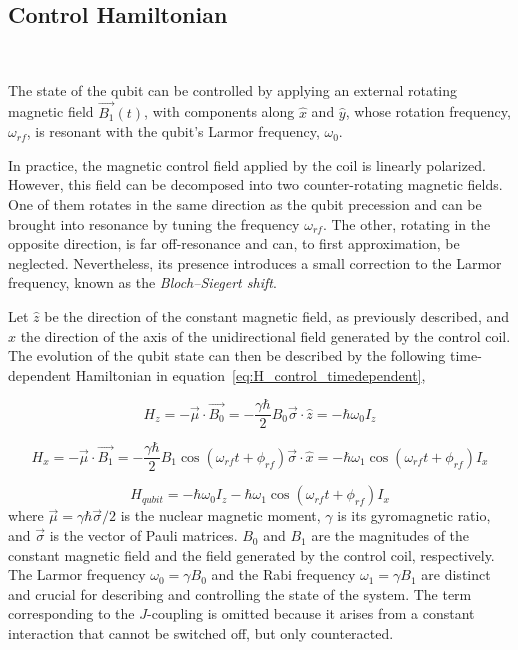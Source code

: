 \subsection{Control Hamiltonian}
~\label{subsec:control_hamiltonian}

The state of the qubit can be controlled by applying an external rotating magnetic field \(\vec{B_1}(t)\), with components along \(\hat{x}\) and \(\hat{y}\), whose rotation frequency, \(\omega_{rf}\), is resonant with the qubit’s Larmor frequency, \(\omega_0\).

In practice, the magnetic control field applied by the coil is linearly polarized. However, this field can be decomposed into two counter-rotating magnetic fields. One of them rotates in the same direction as the qubit precession and can be brought into resonance by tuning the frequency \(\omega_{rf}\). The other, rotating in the opposite direction, is far off-resonance and can, to first approximation, be neglected. Nevertheless, its presence introduces a small correction to the Larmor frequency, known as the \emph{Bloch–Siegert shift}.

Let \(\hat{z}\) be the direction of the constant magnetic field, as previously described, and \(\hat{x}\) the direction of the axis of the unidirectional field generated by the control coil. The evolution of the qubit state can then be described by the following time-dependent Hamiltonian in equation~\ref{eq:H_control_timedependent},

\begin{equation}
    H_{z}=-\vec{\mu} \cdot \vec{B_0} = -\frac{\gamma\hbar}{2}B_0 \vec{\sigma}\cdot\hat{z} =-\hbar\omega_0I_z
    \label{eq:H_static_field}
\end{equation}

\begin{equation}
    H_{x}=-\vec{\mu} \cdot \vec{B_1} = -\frac{\gamma\hbar}{2} B_1\cos{(\omega_{rf}t+\phi_{rf})\vec{\sigma}\cdot \hat{x}} =-\hbar\omega_1\cos{(\omega_{rf}t+\phi_{rf})I_x}
    \label{eq:H_control_field}
\end{equation}

\begin{equation}
    H_{qubit}=-\hbar \omega_0 I_z -\hbar \omega_1 \cos(\omega_{rf} t+\phi_{rf})I_x
    \label{eq:H_control_timedependent}
\end{equation}
where \(\vec{\mu}=\gamma\hbar\vec{\sigma}/2\) is the nuclear magnetic moment, \(\gamma\) is its gyromagnetic ratio, and \(\vec{\sigma}\) is the vector of Pauli matrices. \(B_0\) and \(B_1\) are the magnitudes of the constant magnetic field and the field generated by the control coil, respectively. The Larmor frequency \(\omega_0=\gamma B_0\) and the Rabi frequency \(\omega_1=\gamma B_1\) are distinct and crucial for describing and controlling the state of the system. The term corresponding to the \(J\)-coupling is omitted because it arises from a constant interaction that cannot be switched off, but only counteracted.

